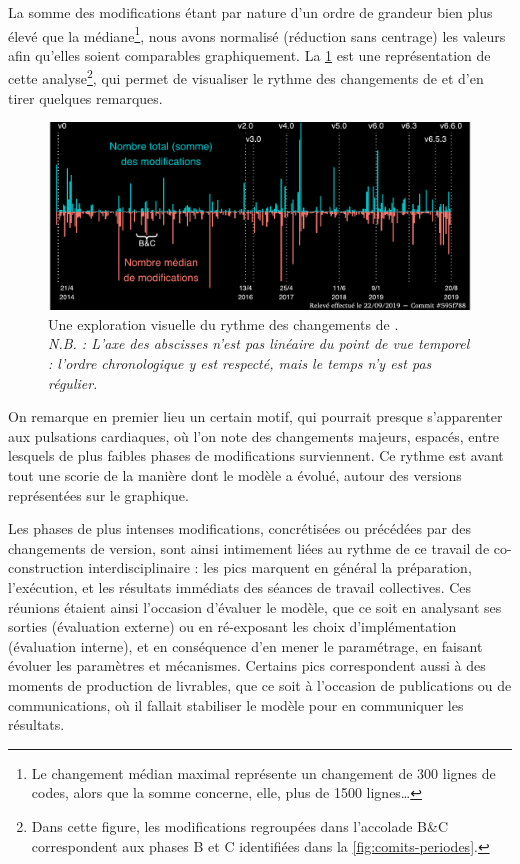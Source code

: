 La somme des modifications étant par nature d'un ordre de grandeur bien plus élevé que la médiane\footnote{
	Le changement médian maximal représente un changement de 300 lignes de codes, alors que la somme concerne, elle, plus de 1500 lignes\ldots
}, nous avons normalisé (réduction sans centrage) les valeurs afin qu'elles soient comparables graphiquement.
La \cref{fig:explo-edits-code} est une représentation de cette analyse\footnote{
	Dans cette figure, les modifications regroupées dans l'accolade \og B\&C\fg{} correspondent aux phases B et C identifiées dans la \cref{fig:comits-periodes}.
}, qui permet de visualiser le \og rythme\fg{} des changements de \simfeodal{} et d'en tirer quelques remarques.

\begin{figure}[H]
	\includegraphics[width=1\linewidth]{img/explo_edits_code_clean.pdf}
	\caption[Une exploration visuelle du rythme des changements de \simfeodal{}.]{Une exploration visuelle du rythme des changements de \simfeodal{}.\\
		\textit{N.B. : L'axe des abscisses n'est pas linéaire du point de vue temporel : l'ordre chronologique y est respecté, mais le temps n'y est pas régulier.}
	}
	\label{fig:explo-edits-code}
\end{figure}

On remarque en premier lieu un certain motif, qui pourrait presque s'apparenter aux pulsations cardiaques, où l'on note des changements majeurs, espacés, entre lesquels de plus faibles phases de modifications surviennent.
Ce \og rythme\fg{} est avant tout une scorie de la manière dont le modèle a évolué, autour des versions représentées sur le graphique.

Les phases de plus intenses modifications, concrétisées ou précédées par des changements de version, sont ainsi intimement liées au rythme de ce travail de co-construction interdisciplinaire : les pics marquent en général la préparation, l'exécution, et les résultats immédiats des séances de travail collectives.
Ces réunions étaient ainsi l'occasion d'évaluer le modèle, que ce soit en analysant ses sorties (évaluation externe) ou en ré-exposant les choix d'implémentation (évaluation interne), et en conséquence d'en mener le paramétrage, en faisant évoluer les paramètres et mécanismes.
Certains pics correspondent aussi à des moments de production de \og livrables\fg{}, que ce soit à l'occasion de publications ou de communications, où il fallait stabiliser le modèle pour en communiquer les résultats.

